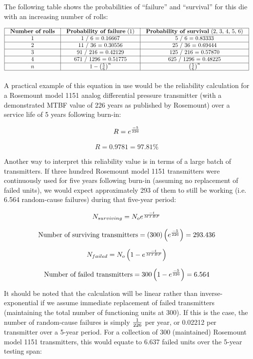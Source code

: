 The following table shows the probabilities of ``failure'' and ``survival'' for this die with an increasing number of rolls: 


$$\vbox{\offinterlineskip
\halign{\strut
\vrule \quad\hfil # \ \hfil & 
\vrule \quad\hfil # \ \hfil & 
\vrule \quad\hfil # \ \hfil \vrule \cr
\noalign{\hrule}
%
\textbf{Number of rolls} & \textbf{Probability of failure} (1) & \textbf{Probability of survival} (2, 3, 4, 5, 6)  \cr
%
\noalign{\hrule}
%
1 & 1 / 6 = 0.16667 & 5 / 6 = 0.83333 \cr
%
\noalign{\hrule}
%
2 & 11 / 36 = 0.30556 & 25 / 36 = 0.69444 \cr
%
\noalign{\hrule}
%
3 & 91 / 216 = 0.42129 & 125 / 216 = 0.57870 \cr
%
\noalign{\hrule}
%
4 & 671 / 1296 = 0.51775 & 625 / 1296 = 0.48225 \cr
%
\noalign{\hrule}
%
$n$ & $1 - \left(5 \over 6\right)^n$ & $\left(5 \over 6\right)^n$ \cr
%
\noalign{\hrule}
} %
}$$ %

\vskip 10pt

\filbreak

A practical example of this equation in use would be the reliability calculation for a Rosemount model 1151 analog differential pressure transmitter (with a demonstrated MTBF value of 226 years as published by Rosemount) over a service life of 5 years following burn-in:

$$R = e^{-5 \over 226}$$

$$R = 0.9781 = 97.81 \%$$

Another way to interpret this reliability value is in terms of a large batch of transmitters.  If three hundred Rosemount model 1151 transmitters were continuously used for five years following burn-in (assuming no replacement of failed units), we would expect approximately 293 of them to still be working (i.e. 6.564 random-cause failures) during that five-year period:

$$N_{surviving} = N_o e^{-t \over MTBF}$$

$$\hbox{Number of surviving transmitters} = (300) \left(e^{-5 \over 226}\right) = 293.436$$

$$N_{failed} = N_o \left(1 - e^{-t \over MTBF}\right)$$

$$\hbox{Number of failed transmitters} = 300 \left(1 - e^{-5 \over 226}\right) = 6.564$$

It should be noted that the calculation will be linear rather than inverse-exponential if we assume immediate replacement of failed transmitters (maintaining the total number of functioning units at 300).  If this is the case, the number of random-cause failures is simply $1 \over 226$ per year, or 0.02212 per transmitter over a 5-year period.  For a collection of 300 (maintained) Rosemount model 1151 transmitters, this would equate to 6.637 failed units over the 5-year testing span:

